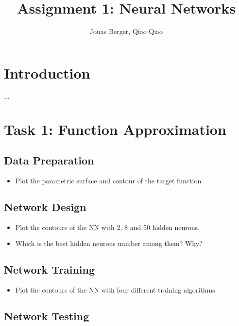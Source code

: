 \documentclass[a4paper,12pt]{article}
\title{Assignment 1: Neural Networks} %
\author{Jonas Berger, Qiao Qiao} %
\institute{Technische Universit\"{a}t M\"{u}nchen} %
\begin{document}
\maketitle

\section{Introduction}
...



\section{Task 1: Function Approximation}

\subsection{Data Preparation}

\begin{itemize}

 \item Plot the parametric surface and contour of the target function

\end{itemize}

\subsection{Network Design}

\begin{itemize}

	\item Plot the contours of the NN with 2, 8 and 50 hidden neurons.

	\item Which is the best hidden neurons number among them? Why?

\end{itemize}

\subsection{Network Training}

\begin{itemize}

	\item Plot the contours of the NN with four different training algorithms.

\end{itemize}

\subsection{Network Testing}
\end{document}
